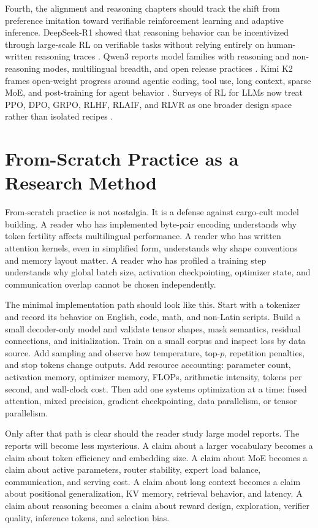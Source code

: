 Fourth, the alignment and reasoning chapters should track the shift from preference imitation toward verifiable reinforcement learning and adaptive inference. DeepSeek-R1 showed that reasoning behavior can be incentivized through large-scale RL on verifiable tasks without relying entirely on human-written reasoning traces \cite{deepseek2025r1}. Qwen3 reports model families with reasoning and non-reasoning modes, multilingual breadth, and open release practices \cite{yang2025qwen3}. Kimi K2 frames open-weight progress around agentic coding, tool use, long context, sparse MoE, and post-training for agent behavior \cite{kimi2025k2}. Surveys of RL for LLMs now treat PPO, DPO, GRPO, RLHF, RLAIF, and RLVR as one broader design space rather than isolated recipes \cite{srivastava2025rlsurvey}.

\section{From-Scratch Practice as a Research Method}
\label{sec:from-scratch-practice}

From-scratch practice is not nostalgia. It is a defense against cargo-cult model building. A reader who has implemented byte-pair encoding understands why token fertility affects multilingual performance. A reader who has written attention kernels, even in simplified form, understands why shape conventions and memory layout matter. A reader who has profiled a training step understands why global batch size, activation checkpointing, optimizer state, and communication overlap cannot be chosen independently.

The minimal implementation path should look like this. Start with a tokenizer and record its behavior on English, code, math, and non-Latin scripts. Build a small decoder-only model and validate tensor shapes, mask semantics, residual connections, and initialization. Train on a small corpus and inspect loss by data source. Add sampling and observe how temperature, top-$p$, repetition penalties, and stop tokens change outputs. Add resource accounting: parameter count, activation memory, optimizer memory, FLOPs, arithmetic intensity, tokens per second, and wall-clock cost. Then add one systems optimization at a time: fused attention, mixed precision, gradient checkpointing, data parallelism, or tensor parallelism.

Only after that path is clear should the reader study large model reports. The reports will become less mysterious. A claim about a larger vocabulary becomes a claim about token efficiency and embedding size. A claim about MoE becomes a claim about active parameters, router stability, expert load balance, communication, and serving cost. A claim about long context becomes a claim about positional generalization, KV memory, retrieval behavior, and latency. A claim about reasoning becomes a claim about reward design, exploration, verifier quality, inference tokens, and selection bias.

